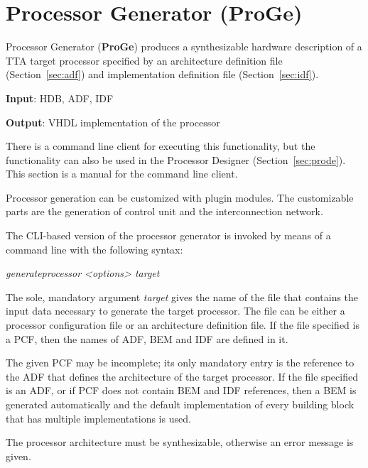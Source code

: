 \documentclass[a4paper,twoside]{tceusermanual}
\begin{document}
\section{Processor Generator (ProGe)}
\label{sec:proge}

Processor Generator (\textbf{ProGe}) produces a synthesizable hardware
description of a TTA target processor specified by an architecture
definition file (Section~\ref{sec:adf}) and implementation definition file
(Section~\ref{sec:idf}).

\textbf{Input}: HDB, ADF, IDF

\textbf{Output}: VHDL implementation of the processor

There is a command line client for executing this functionality, but the
functionality can also be used in the Processor Designer
(Section~\ref{sec:prode}). This section is a manual for the command line
client.

Processor generation can be customized with plugin modules. The customizable
parts are the generation of control unit and the interconnection network.

The CLI-based version of the processor generator is invoked by means of a
command line with the following syntax:

  \textit{generateprocessor <options> target}

The sole, mandatory argument \emph{target} gives the name of the file that
contains the input data necessary to generate the target processor. The file
can be either a processor configuration file or an architecture definition
file. If the file specified is a PCF, then the names of ADF, BEM and IDF are
defined in it.

The given PCF may be incomplete; its only mandatory entry is the reference
to the ADF that defines the architecture of the target processor.  If the
file specified is an ADF, or if PCF does not contain BEM and IDF references,
then a BEM is generated automatically and the default implementation of every
building block that has multiple implementations is used.

The processor architecture must be synthesizable, otherwise an error message
is given. \\
\end{document}
